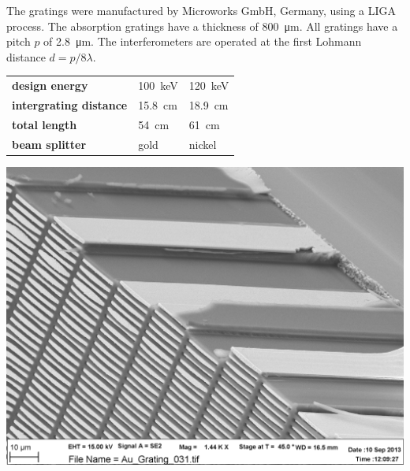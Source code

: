 \documentclass[a0,portrait]{a0poster}
\newenvironment{spacedcenter}{\vspace{2cm}\begin{center}}
        {\end{center}\vspace{2cm}\par}
\begin{document}
\begin{multicols}{2}
The gratings were manufactured by Microworks GmbH, Germany, using a LIGA
process. The absorption gratings have a thickness of \SI{800}{\micro\metre}.
All gratings have a pitch $p$ of \SI{2.8}{\micro\metre}.
The interferometers are operated at the first Lohmann distance $d = p / 8
\lambda$.
\begin{spacedcenter}
\begin{tabular}{lll}
    \textbf{design energy} & \SI{100}{\kilo\eV} & \SI{120}{\kilo\eV}\\
    \textbf{intergrating distance} & \SI{15.8}{\centi\metre} &
    \SI{18.9}{\centi\metre}\\
    \textbf{total length} & \SI{54}{\centi\metre} & \SI{61}{\centi\metre}\\
    \textbf{beam splitter} & gold & nickel \\
\end{tabular}
\end{spacedcenter}
\begin{center}
    \includegraphics[width=0.5\linewidth]{Au_Grating_031.pdf}
\end{center}




\end{multicols}
\end{document}
